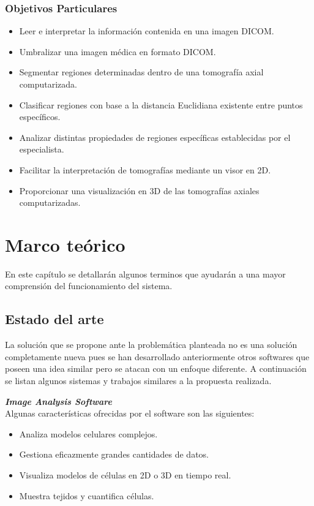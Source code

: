 \documentclass[12pt]{report}
\begin{document}
\subsection{Objetivos Particulares}
\begin{itemize}
\item Leer e interpretar la información contenida en una imagen DICOM.
\item Umbralizar una imagen médica en formato DICOM.
\item Segmentar regiones determinadas dentro de una tomografía axial computarizada.
\item Clasificar regiones con base a la distancia Euclidiana existente entre puntos específicos.
\item Analizar distintas propiedades de regiones específicas establecidas por el especialista.
\item Facilitar la interpretación de tomografías mediante un visor en 2D.
\item Proporcionar una visualización en 3D de las tomografías axiales computarizadas.
\end{itemize}


\chapter{Marco teórico}
En este capítulo se detallarán algunos terminos que ayudarán a una mayor comprensión del funcionamiento del sistema.
\section{Estado del arte}
La solución que se propone ante la problemática planteada no es una solución completamente nueva pues se han desarrollado anteriormente otros softwares que poseen una idea similar pero se atacan con un enfoque diferente. A continuación se listan algunos sistemas y trabajos similares a la propuesta realizada.

\hfill\break
\textbf{\textit{Image Analysis Software}}\cite{ims}
\\Algunas características ofrecidas por el software son las siguientes:
\begin{itemize}
\item Analiza modelos celulares complejos.
\item Gestiona eficazmente grandes cantidades de datos.
\item Visualiza modelos de células en 2D o 3D en tiempo real.
\item Muestra tejidos y cuantifica células.
\end{itemize}
\end{document}
